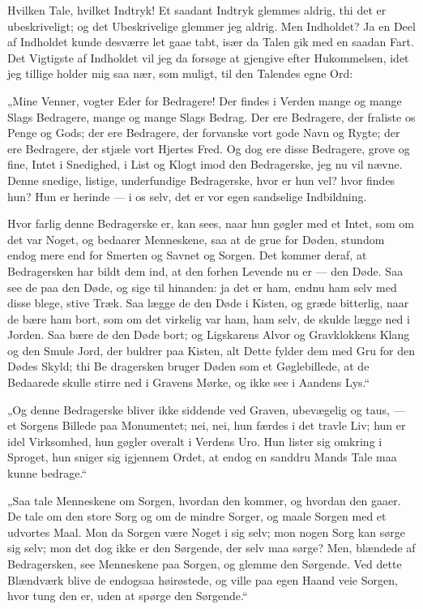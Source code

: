 \documentclass[12pt,a4paper]{book}
\newcommand{\apage}[1]{\marginnote{\footnotesize\textit{[#1]}}}
\begin{document}
Hvilken Tale, hvilket Indtryk! Et saadant Indtryk glemmes aldrig, thi det
er ubeskriveligt; og det Ubeskrivelige glemmer jeg aldrig. Men Indholdet?
Ja en Deel af Indholdet kunde desværre let gaae tabt, især da Talen gik
med en saadan Fart. Det Vigtigste af Indholdet vil jeg da forsøge at
gjengive efter Hukommelsen, idet jeg tillige holder mig saa nær, som
muligt, til den Talendes egne Ord:

„Mine Venner, vogter Eder for Bedragere! Der findes i Verden mange og
mange Slags Bedragere, mange og mange Slags Bedrag. Der ere Bedragere,
der fraliste os Penge og Gods; der ere Bedragere, der forvanske vort gode
Navn og Rygte; der ere Bedragere, der stjæle vort Hjertes Fred. Og dog
ere disse Bedragere, grove og fine, Intet i Snedighed, i List og Klogt
imod den Bedragerske, jeg nu vil nævne. Denne snedige, listige,
underfundige Bedragerske, hvor er hun vel? hvor findes hun? Hun er
herinde — i os selv, det er vor egen sandselige Indbildning.

Hvor farlig denne Bedragerske er, kan sees, naar hun gøgler med et Intet,
som om det var Noget, og bedaarer Menneskene, saa at de grue for Døden,
stundom endog mere end for Smerten og Savnet og Sorgen. Det kommer deraf,
at Bedragersken har bildt dem ind, at den forhen Levende nu er — den
Døde. Saa see de paa den Døde, og sige til hinanden: ja det er ham,
endnu ham selv med disse blege, stive Træk. Saa lægge de den Døde i
Kisten, og græde bitterlig, naar de bære ham bort, som om det virkelig
var ham, ham selv, de skulde lægge ned i Jorden. Saa bære de den Døde
bort; og Ligskarens Alvor og Gravklokkens Klang og den Smule Jord, der
buldrer paa Kisten, alt Dette fylder dem med Gru for den Dødes Skyld; thi \apage{35}
Be\-%
dragersken bruger Døden som et Gøglebillede, at de Bedaarede skulle
stirre ned i Gravens Mørke, og ikke see i Aandens Lys.“

„Og denne Bedragerske bliver ikke siddende ved Graven, ubevægelig og
taus, — et Sorgens Billede paa Monumentet; nei, nei, hun færdes i det
travle Liv; hun er idel Virksomhed, hun gøgler overalt i Verdens Uro. Hun
lister sig omkring i Sproget, hun sniger sig igjennem Ordet, at endog en
sanddru Mands Tale maa kunne bedrage.“

„Saa tale Menneskene om Sorgen, hvordan den kommer, og hvordan den
gaaer. De tale om den store Sorg og om de mindre Sorger, og maale
Sorgen med et udvortes Maal. Mon da Sorgen være Noget i sig selv; mon
nogen Sorg kan sørge sig selv; mon det dog ikke er den Sørgende, der
selv maa sørge? Men, blændede af Bedragersken, see Menneskene paa
Sorgen, og glemme den Sørgende. Ved dette Blændværk blive de endogsaa
høirøstede, og ville paa egen Haand veie Sorgen, hvor tung den er, uden
at spørge den Sørgende.“
\end{document}
